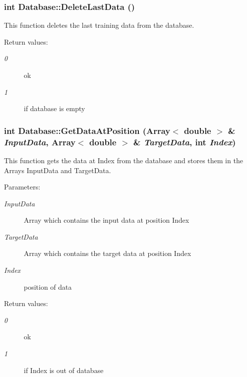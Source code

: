 \subsubsection{\setlength{\rightskip}{0pt plus 5cm}int Database::Delete\-Last\-Data ()}\label{classDatabase_a3}


This function deletes the last training data from the database.

\begin{Desc}
\item[Return values: ]\par
\begin{description}
\item[{\em 
0}]ok \item[{\em 
1}]if database is empty \end{description}
\end{Desc}
\subsubsection{\setlength{\rightskip}{0pt plus 5cm}int Database::Get\-Data\-At\-Position (Array$<$ double $>$ \& {\em Input\-Data}, Array$<$ double $>$ \& {\em Target\-Data}, int {\em Index})}\label{classDatabase_a6}


This function gets the data at Index from the database and stores them in the Arrays Input\-Data and Target\-Data.

\begin{Desc}
\item[Parameters: ]\par
\begin{description}
\item[{\em 
Input\-Data}]Array which contains the input data at position Index \item[{\em 
Target\-Data}]Array which contains the target data at position Index \item[{\em 
Index}]position of data \end{description}
\end{Desc}
\begin{Desc}
\item[Return values: ]\par
\begin{description}
\item[{\em 
0}]ok \item[{\em 
1}]if Index is out of database \end{description}
\end{Desc}

